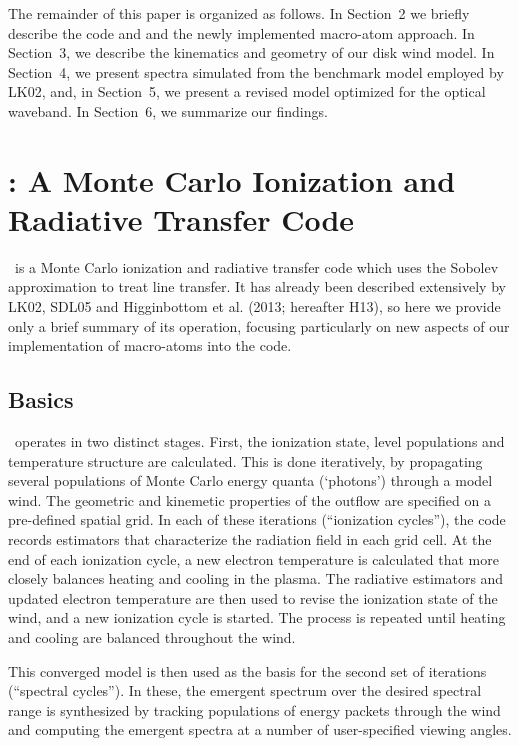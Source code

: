 \documentclass[preprint, a4paper, 11pt]{aastex}
\begin{document}
The remainder of this paper is organized as follows. In Section~2 we
briefly describe the code and and the newly implemented macro-atom
approach. In Section~3, we describe the kinematics and geometry of our
disk wind model. 
In Section~4, we present spectra simulated from the benchmark model
employed by LK02, and, in Section~5, we present a revised model
optimized for the optical waveband. In Section~6, we summarize our
findings.


%
%

\section{: A Monte Carlo Ionization and Radiative Transfer Code}

\py\ is a Monte Carlo  ionization and radiative transfer code which
uses the Sobolev approximation to treat line transfer. It has already
been described extensively by LK02, SDL05 and Higginbottom et al. (2013; hereafter H13), 
so here we provide only a brief summary of its operation, focusing particularly on new
aspects of our implementation of macro-atoms into the code. 

\subsection{Basics} 

\py\ operates in two distinct stages. First, the ionization state,
level populations and temperature structure are calculated. This is
done iteratively, by 
propagating several populations of Monte Carlo energy quanta (`photons')
through a model wind. The geometric and kinemetic properties of the
outflow are specified on a pre-defined spatial grid. In each of these
iterations (``ionization cycles''), the code records estimators that 
characterize the radiation field in each grid cell. At the end 
of each ionization cycle, a new electron temperature is calculated
that more closely balances heating and cooling in the 
plasma. The radiative estimators and updated electron
temperature are then used to revise the ionization state of the wind,
and a new ionization cycle is started. The process is repeated until
heating and cooling are balanced throughout the wind. 

This converged model is then used as the basis for the second set of
iterations (``spectral cycles''). In these, the emergent spectrum over
the desired spectral range is synthesized by tracking populations of
energy packets through the wind and computing the emergent spectra at
a number of user-specified viewing angles.  
\end{document}
